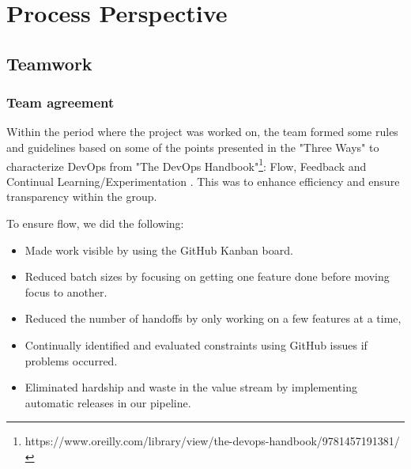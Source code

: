 \newpage
\section{Process Perspective}






\subsection{Teamwork}
\subsubsection{Team agreement}
Within the period where the project was worked on, the team formed some rules and guidelines based on some of the points presented in the "Three Ways" to characterize DevOps from "The DevOps Handbook"\footnote{https://www.oreilly.com/library/view/the-devops-handbook/9781457191381/}: Flow, Feedback and Continual Learning/Experimentation . This was to enhance efficiency and ensure transparency within the group.

\noindent To ensure flow, we did the following:
\begin{itemize}
    \item Made work visible by using the GitHub Kanban board.
    \item Reduced batch sizes by focusing on getting one feature done before moving focus to another.
    \item Reduced the number of handoffs by only working on a few features at a time,
    \item Continually identified and evaluated constraints using GitHub issues if problems occurred.
    \item Eliminated hardship and waste in the value stream by implementing automatic releases in our pipeline.
\end{itemize}

